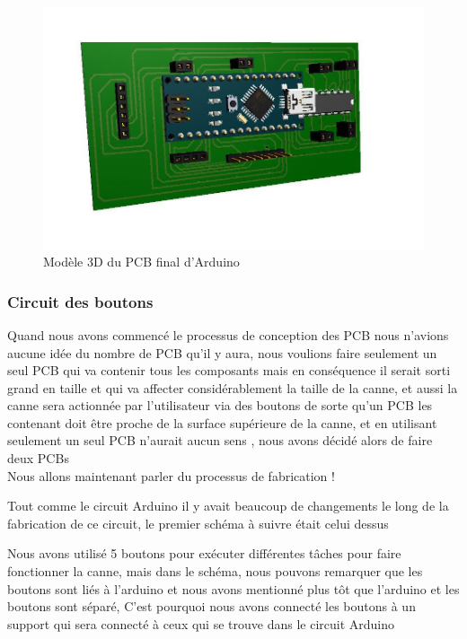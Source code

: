 \begin{figure}[!htbp]
    \centering
    \includegraphics[width=\textwidth]{assets/conception1/img65.jpg}
    \caption{Modèle 3D du PCB final d'Arduino}
\end{figure}

\FloatBarrier

\subsubsection{Circuit des boutons}
\label{buttons-circuit-conception}
Quand nous avons commencé le processus de conception des PCB nous n’avions aucune idée du nombre de PCB qu’il y aura, nous voulions faire seulement un seul PCB qui va contenir tous les composants mais en conséquence il serait sorti grand en taille et qui va affecter considérablement la taille de la canne, et aussi la canne sera actionnée par l’utilisateur via des boutons de sorte qu’un PCB les contenant doit être proche de la surface supérieure de la canne, et en utilisant seulement un seul PCB n’aurait aucun sens , nous avons décidé alors de faire deux PCBs  \\
Nous allons maintenant parler du processus de fabrication !

Tout comme le circuit Arduino il y avait beaucoup de changements le long de la fabrication de ce circuit, le premier schéma à suivre était celui dessus

Nous avons utilisé 5 boutons pour exécuter différentes tâches pour faire fonctionner la canne, mais dans le schéma, nous pouvons remarquer que les boutons sont liés à l’arduino et nous avons mentionné plus tôt que l’arduino et les boutons sont séparé, C’est pourquoi nous avons connecté les boutons à un support qui sera connecté à ceux qui se trouve dans le circuit Arduino

